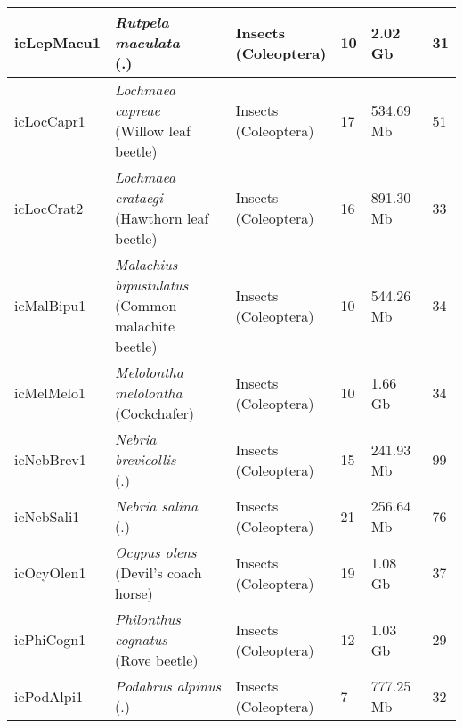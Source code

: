 \begin{centering}
\begin{longtable}{l|l|l|l|l|l}
icLepMacu1 & \makecell[{l}]{\textit{Rutpela maculata} \\ (.)} & \makecell[{l}]{Insects \\ (Coleoptera)} & 10 & 2.02 Gb & 31  \\ \hline
icLocCapr1 & \makecell[{l}]{\textit{Lochmaea capreae} \\ (Willow leaf beetle)} & \makecell[{l}]{Insects \\ (Coleoptera)} & 17 & 534.69 Mb & 51  \\ \hline
icLocCrat2 & \makecell[{l}]{\textit{Lochmaea crataegi} \\ (Hawthorn leaf beetle)} & \makecell[{l}]{Insects \\ (Coleoptera)} & 16 & 891.30 Mb & 33  \\ \hline
icMalBipu1 & \makecell[{l}]{\textit{Malachius bipustulatus} \\ (Common malachite beetle)} & \makecell[{l}]{Insects \\ (Coleoptera)} & 10 & 544.26 Mb & 34  \\ \hline
icMelMelo1 & \makecell[{l}]{\textit{Melolontha melolontha} \\ (Cockchafer)} & \makecell[{l}]{Insects \\ (Coleoptera)} & 10 & 1.66 Gb & 34  \\ \hline
icNebBrev1 & \makecell[{l}]{\textit{Nebria brevicollis} \\ (.)} & \makecell[{l}]{Insects \\ (Coleoptera)} & 15 & 241.93 Mb & 99  \\ \hline
icNebSali1 & \makecell[{l}]{\textit{Nebria salina} \\ (.)} & \makecell[{l}]{Insects \\ (Coleoptera)} & 21 & 256.64 Mb & 76  \\ \hline
icOcyOlen1 & \makecell[{l}]{\textit{Ocypus olens} \\ (Devil's coach horse)} & \makecell[{l}]{Insects \\ (Coleoptera)} & 19 & 1.08 Gb & 37  \\ \hline
icPhiCogn1 & \makecell[{l}]{\textit{Philonthus cognatus} \\ (Rove beetle)} & \makecell[{l}]{Insects \\ (Coleoptera)} & 12 & 1.03 Gb & 29  \\ \hline
icPodAlpi1 & \makecell[{l}]{\textit{Podabrus alpinus} \\ (.)} & \makecell[{l}]{Insects \\ (Coleoptera)} & 7 & 777.25 Mb & 32  \\ \hline

\end{longtable}
\end{centering}
